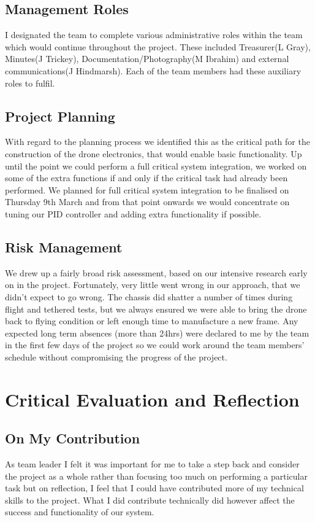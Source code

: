 \documentclass[a4paper,11pt]{article}
\begin{document}
\subsection{Management Roles}
I designated the team to complete various administrative roles within the team which would continue throughout the project. These included Treasurer(L Gray), Minutes(J Trickey), Documentation/Photography(M Ibrahim) and external communications(J Hindmarsh). Each of the team members had these auxiliary roles to fulfil.
\subsection{Project Planning}
With regard to the planning process we identified this as the critical path for the construction of the drone electronics, that would enable basic functionality. Up until the point we could perform a full critical system integration, we worked on some of the extra functions if and only if the critical task had already been performed. We planned for full critical system integration to be finalised on Thursday 9th March and from that point onwards we would concentrate on tuning our PID controller and adding extra functionality if possible.
\subsection{Risk Management}
We drew up a fairly broad risk assessment, based on our intensive research early on in the project. Fortunately, very little went wrong in our approach, that we didn't expect to go wrong. The chassis did shatter a number of times during flight and tethered tests, but we always ensured we were able to bring the drone back to flying condition or left enough time to manufacture a new frame. Any expected long term absences (more than 24hrs) were declared to me by the team in the first few days of the project so we could work around the team members' schedule without compromising the progress of the project.


\section{Critical Evaluation and Reflection}
\subsection{On My Contribution}
 As team leader I felt it was important for me to take a step back and consider the project as a whole rather than focusing too much on performing a particular task but on reflection, I feel that I could have contributed more of my technical skills to the project. What I did contribute technically did however affect the success and functionality of our system.  
\end{document}
